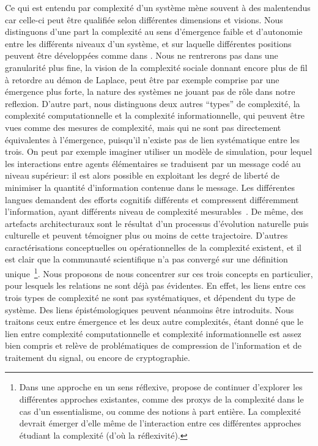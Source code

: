 Ce qui est entendu par complexité d'un système mène souvent à des malentendus car celle-ci peut être qualifiée selon différentes dimensions et visions. Nous distinguons d'une part la complexité au sens d'émergence faible et d'autonomie entre les différents niveaux d'un système, et sur laquelle différentes positions peuvent être développées comme dans \cite{deffuant2015visions}. Nous ne rentrerons pas dans une granularité plus fine, la vision de la complexité sociale donnant encore plus de fil à retordre au démon de Laplace, peut être par exemple comprise par une émergence plus forte, la nature des systèmes ne jouant pas de rôle dans notre reflexion. D'autre part, nous distinguons deux autres ``types'' de complexité, la complexité computationnelle et la complexité informationnelle, qui peuvent être vues comme des mesures de complexité, mais qui ne sont pas directement équivalentes à l'émergence, puisqu'il n'existe pas de lien systématique entre les trois. On peut par exemple imaginer utiliser un modèle de simulation, pour lequel les interactions entre agents élémentaires se traduisent par un message codé au niveau supérieur: il est alors possible en exploitant les degré de liberté de minimiser la quantité d'information contenue dans le message. Les différentes langues demandent des efforts cognitifs différents et compressent différemment l'information, ayant différents niveau de complexité mesurables~\cite{febres2013complexity}. De même, des artefacts architecturaux sont le résultat d'un processus d'évolution naturelle puis culturelle et peuvent témoigner plus ou moins de cette trajectoire. D'autres caractérisations conceptuelles ou opérationnelles de la complexité existent, et il est clair que la communauté scientifique n'a pas convergé sur une définition unique~\cite{chu2008criteria}\footnote{Dans une approche en un sens réflexive, \cite{chu2008criteria} propose de continuer d'explorer les différentes approches existantes, comme des proxys de la complexité dans le cas d'un essentialisme, ou comme des notions à part entière. La complexité devrait émerger d'elle même de l'interaction entre ces différentes approches étudiant la complexité (d'où la réflexivité).}. Nous proposons de nous concentrer sur ces trois concepts en particulier, pour lesquels les relations ne sont déjà pas évidentes. En effet, les liens entre ces trois types de complexité ne sont pas systématiques, et dépendent du type de système. Des liens épistémologiques peuvent néanmoins être introduits. Nous traitons ceux entre émergence et les deux autre complexités, étant donné que le lien entre complexité computationnelle et complexité informationnelle est assez bien compris et relève de problématiques de compression de l'information et de traitement du signal, ou encore de cryptographie.

